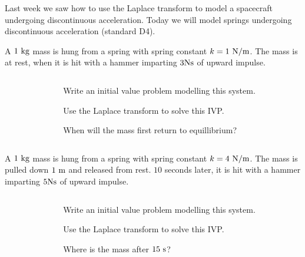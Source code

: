 \begin{applicationActivities}

\begin{observation}
Last week we saw how to use the Laplace transform to model a spacecraft undergoing discontinuous acceleration.
\vfill
Today we will model springs undergoing discontinuous acceleration (standard D4).
\end{observation}

\begin{activity}{10}
A \(1\ {\rm kg}\) mass is hung from a spring with spring constant \(k=1\ {\rm N/m}\).  The mass is at rest, when it is hit with a hammer imparting \(3 {\rm N s}\) of upward impulse.
\vfill
\begin{columns}
\begin{column}{0.3\textwidth}
\begin{center}
\springmass
\end{center}
\end{column}
\begin{column}{0.7\textwidth}
\begin{subactivity}
Write an initial value problem modelling this system.
\end{subactivity}
\begin{subactivity}
Use the Laplace transform to solve this IVP.
\end{subactivity}
\begin{subactivity}
When will the mass first return to equillibrium?
\end{subactivity}
\end{column}
\end{columns}
\end{activity}

\begin{activity}{15}
A \(1\ {\rm kg}\) mass is hung from a spring with spring constant \(k=4\ {\rm N/m}\).  The mass is pulled down \(1{\ \rm m}\) and released from rest.  \(10\) seconds later, it is hit with a hammer imparting \(5 {\rm N s}\) of upward impulse.
\vfill
\begin{columns}
\begin{column}{0.3\textwidth}
\begin{center}
\springmass
\end{center}
\end{column}
\begin{column}{0.7\textwidth}
\begin{subactivity}
Write an initial value problem modelling this system.
\end{subactivity}
\begin{subactivity}
Use the Laplace transform to solve this IVP.
\end{subactivity}
\begin{subactivity}
Where is the mass after \(15{\ \rm s}\)?
\end{subactivity}
\end{column}
\end{columns}
\end{activity}


\end{applicationActivities}
